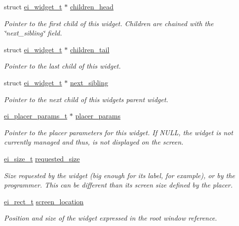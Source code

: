 \begin{DoxyCompactItemize}
struct \hyperlink{structei__widget__t}{ei\+\_\+widget\+\_\+t} $\ast$ \hyperlink{structei__widget__t_a190316f0ec41d2d98b919414c860f828}{children\+\_\+head}
\begin{DoxyCompactList}\small\item\em Pointer to the first child of this widget. Children are chained with the \char`\"{}next\+\_\+sibling\char`\"{} field. \end{DoxyCompactList}\item 
struct \hyperlink{structei__widget__t}{ei\+\_\+widget\+\_\+t} $\ast$ \hyperlink{structei__widget__t_aece2f3059f252538ae787857e7eea2a2}{children\+\_\+tail}
\begin{DoxyCompactList}\small\item\em Pointer to the last child of this widget. \end{DoxyCompactList}\item 
struct \hyperlink{structei__widget__t}{ei\+\_\+widget\+\_\+t} $\ast$ \hyperlink{structei__widget__t_ada15cedaf8e6e104a1461c1754ff6cb3}{next\+\_\+sibling}
\begin{DoxyCompactList}\small\item\em Pointer to the next child of this widget\textquotesingle{}s parent widget. \end{DoxyCompactList}\item 
\hyperlink{structei__placer__params__t}{ei\+\_\+placer\+\_\+params\+\_\+t} $\ast$ \hyperlink{structei__widget__t_a82c675bf68aa3fa5b14b1f20bd157897}{placer\+\_\+params}
\begin{DoxyCompactList}\small\item\em Pointer to the placer parameters for this widget. If N\+U\+LL, the widget is not currently managed and thus, is not displayed on the screen. \end{DoxyCompactList}\item 
\hyperlink{structei__size__t}{ei\+\_\+size\+\_\+t} \hyperlink{structei__widget__t_ae82b19958b3ec72a855986dffb9b92ea}{requested\+\_\+size}
\begin{DoxyCompactList}\small\item\em Size requested by the widget (big enough for its label, for example), or by the programmer. This can be different than its screen size defined by the placer. \end{DoxyCompactList}\item 
\hyperlink{structei__rect__t}{ei\+\_\+rect\+\_\+t} \hyperlink{structei__widget__t_ad139e1541329b54e0b4c8d746e14b204}{screen\+\_\+location}
\begin{DoxyCompactList}\small\item\em Position and size of the widget expressed in the root window reference. \end{DoxyCompactList}\item 

\end{DoxyCompactItemize}
